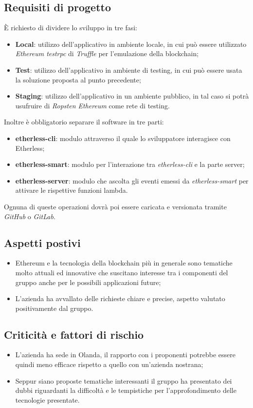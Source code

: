     \subsection{Requisiti di progetto}
        È richiesto di dividere lo sviluppo in tre fasi:
        \begin{itemize}
            \item \textbf{Local}: utilizzo dell'applicativo in ambiente locale, in cui può essere utilizzato \textit{Ethereum testrpc} di \textit{Truffle} per
            l'emulazione della blockchain;
            \item \textbf{Test}: utilizzo dell'applicativo in ambiente di testing, in cui può essere usata la soluzione proposta al punto precedente;
            \item \textbf{Staging}: utilizzo dell'applicativo in un ambiente pubblico, in tal caso si potrà usufruire di \textit{Ropsten Ethereum} come rete di testing.
        \end{itemize}
        Inoltre è obbligatorio separare il software in tre parti:
        \begin{itemize}
            \item \textbf{etherless-cli}: modulo attraverso il quale lo sviluppatore interagisce con Etherless;
            \item \textbf{etherless-smart}: modulo per l'interazione tra \textit{etherless-cli} e la parte server;
            \item \textbf{etherless-server}: modulo che ascolta gli eventi emessi da \textit{etherless-smart} per attivare le rispettive funzioni lambda. 
        \end{itemize}
        Ognuna di queste operazioni dovrà poi essere caricata e versionata tramite \textit{GitHub} o \textit{GitLab}.
    \subsection{Aspetti postivi}
    \begin{itemize}
        \item Ethereum e la tecnologia della blockchain più in generale sono tematiche molto attuali ed innovative che suscitano interesse tra i componenti del gruppo
        anche per le possibili applicazioni future;
        \item L'azienda ha avvallato delle richieste chiare e precise, aspetto valutato positivamente dal gruppo.
    \end{itemize}
    \subsection{Criticità e fattori di rischio}
    \begin{itemize}
        \item L'azienda ha sede in Olanda, il rapporto con i proponenti potrebbe essere quindi meno efficace rispetto a quello con un'azienda nostrana;
        \item Seppur siano proposte tematiche interessanti il gruppo ha presentato dei dubbi riguardanti la difficoltà e le tempistiche per l'approfondimento
        delle tecnologie presentate.
    \end{itemize}
